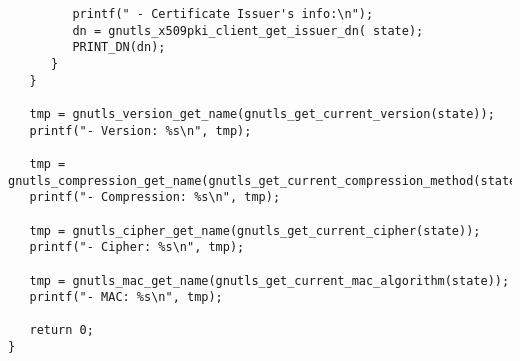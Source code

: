 \begin{verbatim}
         printf(" - Certificate Issuer's info:\n");
         dn = gnutls_x509pki_client_get_issuer_dn( state);
         PRINT_DN(dn);
      }
   }

   tmp = gnutls_version_get_name(gnutls_get_current_version(state));
   printf("- Version: %s\n", tmp);

   tmp = gnutls_compression_get_name(gnutls_get_current_compression_method(state));
   printf("- Compression: %s\n", tmp);

   tmp = gnutls_cipher_get_name(gnutls_get_current_cipher(state));
   printf("- Cipher: %s\n", tmp);

   tmp = gnutls_mac_get_name(gnutls_get_current_mac_algorithm(state));
   printf("- MAC: %s\n", tmp);

   return 0;
}

\end{verbatim}
